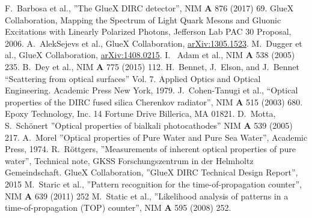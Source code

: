 \documentclass[11pt, a4paper]{article}
\begin{document}
\newpage
\begin{thebibliography}{1}
 F.~Barbosa et al., ''The GlueX DIRC detector'', NIM \textbf{A} 876 (2017) 69.
 GlueX Collaboration, Mapping the Spectrum of Light Quark Mesons and Gluonic Excitations with Linearly Polarized Photons, Jefferson Lab PAC 30 Proposal, 2006.
 A.~AlekSejevs et al., GlueX Collaboration, \url{arXiv:1305.1523}.
 M.~Dugger et al., GlueX Collaboration, \url{arXiv:1408.0215}. 
 I.~ Adam et al., NIM \textbf{A} 538 (2005) 235.
 B.~Dey et al., NIM \textbf{A} 775 (2015) 112.
 H.~Bennet, J.~Elson, and J.~Bennet ``Scattering from optical surfaces'' Vol. 7. Applied Optics and Optical Engineering. Academic Press New York, 1979.
 J.~Cohen-Tanugi et al., ``Optical properties of the DIRC fused silica Cherenkov radiator'', NIM \textbf{A} 515 (2003) 680. 
 Epoxy Technology, Inc. 14 Fortune Drive Billerica, MA 01821.
 D.~Motta, S.~Sch{\"o}nert ''Optical properties of bialkali photocathodes'' NIM \textbf{A} 539 (2005) 217. 
 A.~Morel ''Optical properties of Pure Water and Pure Sea Water'', Academic Press, 1974.
 R.~R{\"o}ttgers, ''Measurements of inherent optical properties of pure water'', Technical note, GKSS Forschungszentrum in der Helmholtz Gemeindschaft.
 GlueX Collaboration, ''GlueX DIRC Technical Design Report'', 2015 
 M.~Staric et al., ''Pattern recognition for the time-of-propagation counter'', NIM \textbf{A} 639 (2011) 252
 M.~Static et al., ''Likelihood analysis of patterns in a time-of-propagation (TOP) counter'', NIM \textbf{A} 595 (2008) 252.
\end{thebibliography}
\end{document}
